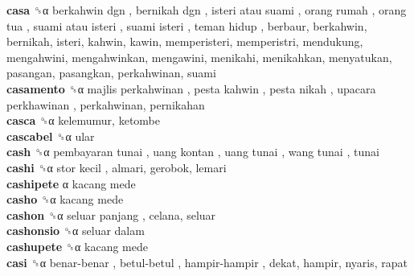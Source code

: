 \textbf{casa} ␝α   berkahwin dgn ,  bernikah dgn ,  isteri atau suami ,  orang rumah ,  orang tua ,  suami atau isteri ,  suami isteri ,  teman hidup , berbaur, berkahwin, bernikah, isteri, kahwin, kawin, memperisteri, memperistri, mendukung, mengahwini, mengahwinkan, mengawini, menikahi, menikahkan, menyatukan, pasangan, pasangkan, perkahwinan, suami  \\
\textbf{casamento} ␝α   majlis perkahwinan ,  pesta kahwin ,  pesta nikah ,  upacara perkhawinan , perkahwinan, pernikahan  \\
\textbf{casca} ␝α  kelemumur, ketombe  \\
\textbf{cascabel} ␝α  ular  \\
\textbf{cash} ␝α   pembayaran tunai ,  uang kontan ,  uang tunai ,  wang tunai , tunai  \\
\textbf{cashi} ␝α   stor kecil , almari, gerobok, lemari  \\
\textbf{cashipete} α   kacang mede   \\
\textbf{casho} ␝α   kacang mede   \\
\textbf{cashon} ␝α   seluar panjang , celana, seluar  \\
\textbf{cashonsio} ␝α   seluar dalam   \\
\textbf{cashupete} ␝α   kacang mede   \\
\textbf{casi} ␝α   benar-benar ,  betul-betul ,  hampir-hampir , dekat, hampir, nyaris, rapat  \\
